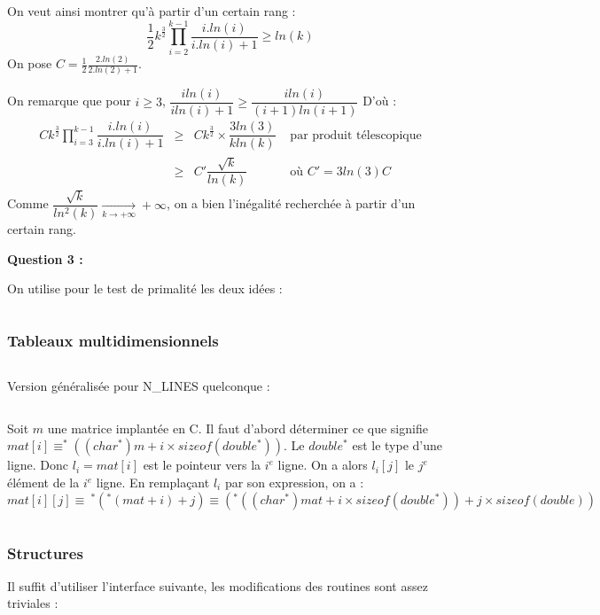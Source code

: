 \documentclass[../main.tex]{subfiles}
\begin{document}
On veut ainsi montrer qu'à partir d'un certain rang :
$$\frac{1}{2}k^{\frac{3}{2}}\displaystyle\prod_{i = 2}^{k-1}\dfrac{i.ln(i)}{i.ln(i) + 1} \geq ln(k)$$
On pose $C = \frac{1}{2}\frac{2.ln(2)}{2.ln(2) + 1}$.

On remarque que pour $i \geq 3$, $\dfrac{iln(i)}{iln(i) + 1}\geq \dfrac{iln(i)}{(i+1)ln(i+1)}$
D'où :
$$\begin{array}{lcll}
Ck^{\frac{3}{2}}\displaystyle\prod_{i = 3}^{k-1}\dfrac{i.ln(i)}{i.ln(i) + 1} & \geq & Ck^{\frac{3}{2}}\times\dfrac{3ln(3)}{kln(k)} & \text{ par produit télescopique} \\
& \geq & C'\dfrac{\sqrt{k}}{ln(k)} & \text{ où }C'=3ln(3)C
\end{array}$$
Comme $\dfrac{\sqrt{k}}{ln^{2}(k)}\underset{k\rightarrow+\infty}{\rightarrow}+\infty$, on a bien l'inégalité recherchée à partir d'un certain rang.

\textbf{Question 3 :}

On utilise pour le test de primalité les deux idées :
\inputminted{c}{solutions/list_primal_optimized_eratosthene.c}
\subsubsection{Tableaux multidimensionnels}
\inputminted{c}{solutions/tab_display_2d.c}
\newline
Version généralisée pour \textsf{N\_LINES} quelconque : 
\inputminted{c}{solutions/triangle.c}
 \newline
Soit $m$ une matrice implantée en C. Il faut d'abord déterminer ce que signifie $mat[i] \equiv ^*((char^*)m + i\times sizeof(double^*))$. Le $double^*$ est le type d'une ligne. Donc $l_{i} = mat[i]$ est le pointeur vers la $i^{e}$ ligne. On a alors $l_{i}[j]$ le $j^e$ élément de la $i^e$ ligne. En remplaçant $l_{i}$ par son expression, on a :
$$mat[i][j] \equiv\ ^*(^*(mat + i) + j) \equiv (^*((char^*)mat + i\times sizeof(double^*)) + j\times sizeof(double)) $$
\inputminted{c}{solutions/matrix.c}
\subsubsection{Structures}
 \newline
Il suffit d'utiliser l'interface suivante, les modifications des routines sont assez triviales :
\inputminted{c}{solutions/matrix.h}
\inputminted{c}{solutions/linkedlist_1.c}
\end{document}
